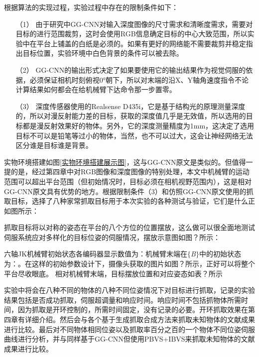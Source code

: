 \documentclass[fontset=fandol,type=bachelor,campus=harbin]{hithesisbook}
\begin{document}
根据算法的实现过程，实验过程中存在的限制条件如下：
\begin{itemize}
\item[（1）]
由于研究中GG-CNN对输入深度图像的尺寸需求和清晰度需求，需要对目标的进行范围裁剪，这时会使用RGB信息确定目标的中心大致范围，所以实验中在平台上铺盖的白纸是必须的。如果有更好的网络能不需要裁剪并稳定指出目标位置，实验环境中白色背景的条件可以被去除。
\item[（2）]
GG-CNN的输出形式决定了如果要使用它的输出结果作为视觉伺服的依据，必须保证相机时刻俯视0°朝下，所以对末端的沿X、Y轴角速度指令不论计算结果如何都会在给机械臂下达命令那一步置零。
\item[（3）]
深度传感器使用的Realsense D435i，它是基于结构光的原理测量深度的，所以对漫反射能力差的目标，获取的深度值几乎是无效值，所以选用的目标都是漫反射效果好的物体。另外，它的深度测量精度为1mm，这决定了选用目标不可以是铅笔等过小的物体，当然，也不可以过大，这会让神经网络无法区分谁是目标谁是背景。
\end{itemize}


实物环境搭建如图\ref{实物环境搭建展示图}，这与GG-CNN原文是类似的。但值得一提的是，经过第四章中对RGB图像和深度图像的特别处理，本文中机械臂的运动范围可以超出平台范围（但初始情况时，目标必须在相机视野范围内），这是相对GG-CNN原文具有优势的地方。根据限制条件（3）和仿照GG-CNN原文使用的抓取目标，选择了八种家常抓取目标用于本次实验的各种测试与验证，它们是什么{\color{red}正如图所示}：


抓取目标将以对称的姿态在平台的八个方位的位置摆放，这么做可以很全面地测试伺服系统应对多样化的目标位姿的伺服情况，摆放示意图{\color{red}如图？所示}：


{\color{red}六轴JK机械臂初始状态各编码器显示数值为：机械臂末端在$\lbrace$\textit{B}$\rbrace$中的初始状态为：。在这样的初始参数设计下，摄像头获取的图片如图？所示，正好可以将整个平台尽收眼底。
相对机械臂末端，目标摆放位置和对应姿态如表？所示}


实验中将会在八种不同的物体的八种不同位姿情况下对目标进行抓取，记录的实验结果包括是否成功抓取，伺服超调量和响应时间。响应时间不包括抓物体所需时间，因为抓取是开环控制的，所需时间固定，没有记录的必要。开环抓取效果在第四章有详细介绍。然后会与各个基于生成抓取合成方法来抓取未知物体的文献成果进行比较。最后对不同物体相同位姿以及抓取率百分之百的一个物体不同位姿伺服曲线进行分析，并与同样基于GG-CNN但使用PBVS+IBVS来抓取未知物体的文献成果\cite{haviland2020control}进行比较。
\end{document}
